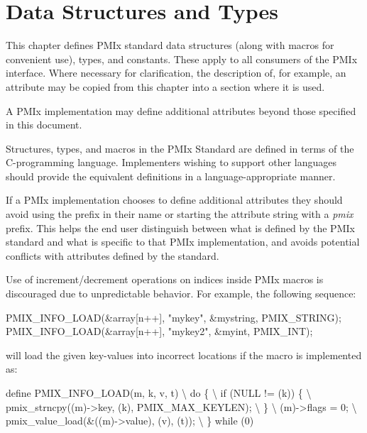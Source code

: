 \chapter{Data Structures and Types}
\label{chap:struct}

This chapter defines PMIx standard data structures (along with macros for convenient use), types, and constants.
These apply to all consumers of the PMIx interface.
Where necessary for clarification, the description of, for example, an attribute may be copied from this chapter into a section where it is used.

A PMIx implementation may define additional attributes beyond those specified in this document.

\adviceimplstart
Structures, types, and macros in the \ac{PMIx} Standard are defined in terms of the C-programming language. Implementers wishing to support other languages should provide the equivalent definitions in a language-appropriate manner.

If a PMIx implementation chooses to define additional attributes they should avoid using the  prefix in their name or starting the attribute string with a \textit{pmix} prefix.
This helps the end user distinguish between what is defined by the PMIx standard and what is specific to that PMIx implementation, and avoids potential conflicts with attributes defined by the standard.
\adviceimplend

\adviceuserstart
Use of increment/decrement operations on indices inside \ac{PMIx} macros is discouraged due to unpredictable behavior. For example, the following sequence:

\begin{codepar}
PMIX_INFO_LOAD(&array[n++], "mykey", &mystring, PMIX_STRING);
PMIX_INFO_LOAD(&array[n++], "mykey2", &myint, PMIX_INT);
\end{codepar}

will load the given key-values into incorrect locations if the macro is implemented as:

\begin{codepar}
define PMIX_INFO_LOAD(m, k, v, t)                      \textbackslash
  do \{                                                 \textbackslash
    if (NULL != (k)) \{                                 \textbackslash
      pmix_strncpy((m)->key, (k), PMIX_MAX_KEYLEN);    \textbackslash
    \}                                                  \textbackslash
    (m)->flags = 0;                                    \textbackslash
    pmix_value_load(&((m)->value), (v), (t));          \textbackslash
  \} while (0)
\end{codepar}

